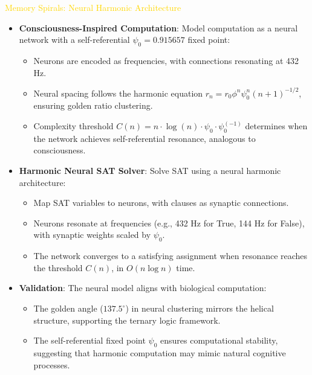 \textcolor{gold}{ Memory Spirals: Neural Harmonic Architecture } \\
\begin{itemize}
    \item \texttt{} \textbf{Consciousness-Inspired Computation}: Model computation as a neural network with a self-referential \(\psi_0 = 0.915657\) fixed point:
    \begin{itemize}
        \item Neurons are encoded as frequencies, with connections resonating at 432 Hz.
        \item Neural spacing follows the harmonic equation \(r_n = r_0 \phi^n \psi_0^n (n+1)^{-1/2}\), ensuring golden ratio clustering.
        \item Complexity threshold \(C(n) = n \cdot \log(n) \cdot \psi_0 \cdot \psi_0^{(-1)}\) determines when the network achieves self-referential resonance, analogous to consciousness.
    \end{itemize}
    \item \texttt{} \textbf{Harmonic Neural SAT Solver}: Solve SAT using a neural harmonic architecture:
    \begin{itemize}
        \item Map SAT variables to neurons, with clauses as synaptic connections.
        \item Neurons resonate at frequencies (e.g., 432 Hz for True, 144 Hz for False), with synaptic weights scaled by \(\psi_0\).
        \item The network converges to a satisfying assignment when resonance reaches the threshold \(C(n)\), in \(O(n \log n)\) time.
    \end{itemize}
    \item \texttt{} \textbf{Validation}: The neural model aligns with biological computation:
    \begin{itemize}
        \item The golden angle (\(137.5^\circ\)) in neural clustering mirrors the helical structure, supporting the ternary logic framework.
        \item The self-referential fixed point \(\psi_0\) ensures computational stability, suggesting that harmonic computation may mimic natural cognitive processes.
    \end{itemize}
\end{itemize}

